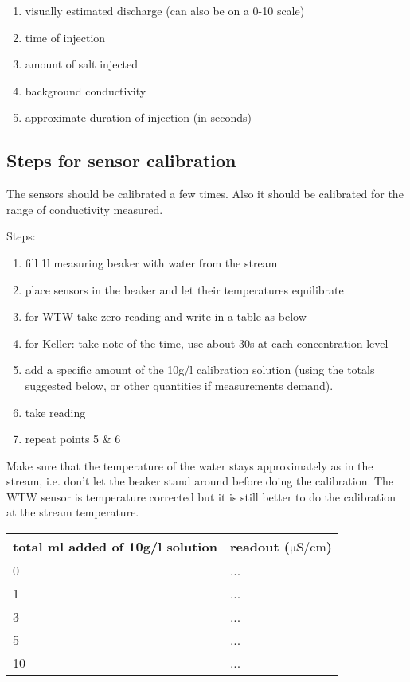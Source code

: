 \documentclass[DIV=15,halfparskip,11pt,headinclude]{scrartcl}
\begin{document}
\begin{enumerate}
\item visually estimated discharge (can also be on a 0-10 scale)
\item time of injection
\item amount of salt injected
\item background conductivity
\item approximate duration of injection (in seconds)
\end{enumerate}

\subsection{Steps for sensor calibration}
\label{sec-2-3}

The sensors should be calibrated a few times.  Also it should be
calibrated for the range of conductivity measured.

Steps:
\begin{enumerate}
\item fill 1l measuring beaker with water from the stream
\item place sensors in the beaker and let their temperatures equilibrate
\item for WTW take zero reading and write in a table as below
\item for Keller: take note of the time, use about 30s at each
  concentration level
\item add a specific amount of the 10g/l calibration solution (using
  the totals suggested below, or other quantities if measurements
  demand).
\item take reading
\item repeat points 5 \& 6
\end{enumerate}

Make sure that the temperature of the water stays approximately as in
the stream, i.e. don't let the beaker stand around before doing the
calibration.  The WTW sensor is temperature corrected but it is still
better to do the calibration at the stream temperature.

\begin{center}
\begin{tabular}{ll}
total ml added of 10g/l solution & readout ($\mathrm{\mu S/cm}$)\\
\hline
0  & ... \\
1 & ...\\
3 & ... \\
5 & ... \\
10 & ... \\
\end{tabular}
\end{center}
\end{document}
